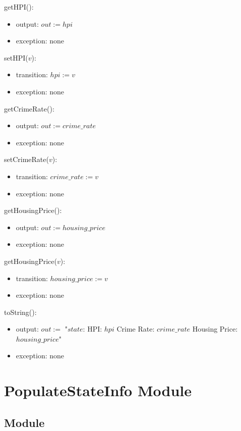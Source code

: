 \documentclass[12pt]{article}
\begin{document}
\noindent getHPI():
\begin{itemize}
\item output: $out := hpi$
\item exception: none
\end{itemize}

\noindent setHPI($v$):
\begin{itemize}
\item transition: $hpi := v$
\item exception: none
\end{itemize}

\noindent getCrimeRate():
\begin{itemize}
\item output: $out := crime\_rate$
\item exception: none
\end{itemize}

\noindent setCrimeRate($v$):
\begin{itemize}
\item transition: $crime\_rate := v$
\item exception: none
\end{itemize}

\noindent getHousingPrice():
\begin{itemize}
\item output: $out := housing\_price$
\item exception: none
\end{itemize}

\noindent getHousingPrice($v$):
\begin{itemize}
\item transition: $housing\_price := v$
\item exception: none
\end{itemize}

\noindent toString():
\begin{itemize}
\item output: $\mathit{out} :=$ "$state$: HPI: $hpi$ Crime Rate: $crime\_rate$ Housing Price: $housing\_price$"
\item exception: none
\end{itemize}


\newpage

\section* {PopulateStateInfo Module}

\subsection* {Module}
\end{document}
